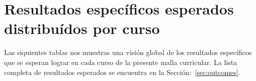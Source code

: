 \section{Resultados específicos esperados distribuídos por curso}\label{sec:specific-outcomes-by-course}
Las siquientes tablas nos muestras una visión global de los resultados específicos que se esperan lograr en cada 
curso de la presente malla curricular. 
La lista completa de resultados esperados se encuentra en la Sección:~\ref{sec:outcomes}.
